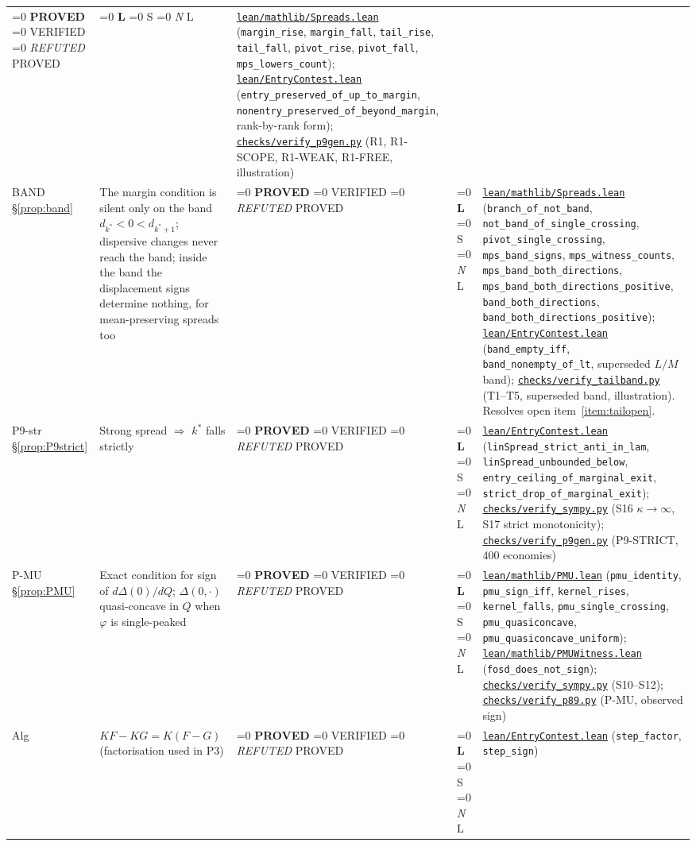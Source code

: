 \documentclass[11pt]{article}
\newcommand{\file}[1]{\href{run:#1}{\texttt{#1}}}
\newcommand{\status}[1]{%
  \ifnum\pdfstrcmp{#1}{PROVED}=0 \textbf{PROVED}%
  \else\ifnum\pdfstrcmp{#1}{VERIFIED}=0 VERIFIED%
  \else\ifnum\pdfstrcmp{#1}{REFUTED}=0 \emph{REFUTED}%
  \else #1\fi\fi\fi}
\newcommand{\tier}[1]{%
  \ifnum\pdfstrcmp{#1}{L}=0 \textbf{L}%
  \else\ifnum\pdfstrcmp{#1}{S}=0 S%
  \else\ifnum\pdfstrcmp{#1}{N}=0 \emph{N}%
  \else #1\fi\fi\fi}
\begin{document}
\begin{longtable}{@{}p{1.5cm}p{5.0cm}p{1.5cm}p{0.8cm}p{6.0cm}@{}}
  \status{PROVED} & \tier{L} &
  \file{lean/mathlib/Spreads.lean} (\texttt{margin\_rise}, \texttt{margin\_fall}, \texttt{tail\_rise}, \texttt{tail\_fall}, \texttt{pivot\_rise}, \texttt{pivot\_fall}, \texttt{mps\_lowers\_count}); \file{lean/EntryContest.lean} (\texttt{entry\_preserved\_of\_up\_to\_margin}, \texttt{nonentry\_preserved\_of\_beyond\_margin}, rank-by-rank form); \file{checks/verify\_p9gen.py} (R1, R1-SCOPE, R1-WEAK, R1-FREE, illustration) \\[4pt]
BAND \S\ref{prop:band} & The margin condition is silent only on the band
  $d_{k^*}<0<d_{k^*+1}$; dispersive changes never reach the band; inside the
  band the displacement signs determine nothing, for mean-preserving spreads
  too &
  \status{PROVED} & \tier{L} &
  \file{lean/mathlib/Spreads.lean} (\texttt{branch\_of\_not\_band},
  \texttt{not\_band\_of\_single\_crossing}, \texttt{pivot\_single\_crossing},
  \texttt{mps\_band\_signs}, \texttt{mps\_witness\_counts},
  \texttt{mps\_band\_both\_directions},
  \texttt{mps\_band\_both\_directions\_positive}, \texttt{band\_both\_directions},
  \texttt{band\_both\_directions\_positive}); \file{lean/EntryContest.lean}
  (\texttt{band\_empty\_iff}, \texttt{band\_nonempty\_of\_lt}, superseded
  $L/M$ band); \file{checks/verify\_tailband.py} (T1--T5, superseded band,
  illustration). Resolves open item~\ref{item:tailopen}. \\[4pt]
P9-str \S\ref{prop:P9strict} & Strong spread $\Rightarrow$ $k^*$ falls strictly &
  \status{PROVED} & \tier{L} &
  \file{lean/EntryContest.lean} (\texttt{linSpread\_strict\_anti\_in\_lam}, \texttt{linSpread\_unbounded\_below}, \texttt{entry\_ceiling\_of\_marginal\_exit}, \texttt{strict\_drop\_of\_marginal\_exit}); \file{checks/verify\_sympy.py} (S16 $\kappa\to\infty$, S17 strict monotonicity); \file{checks/verify\_p9gen.py} (P9-STRICT, 400 economies) \\[4pt]
P-MU \S\ref{prop:PMU} & Exact condition for sign of $d\Delta(0)/dQ$; $\Delta(0,\cdot)$ quasi-concave in $Q$ when $\varphi$ is single-peaked &
  \status{PROVED} & \tier{L} &
  \file{lean/mathlib/PMU.lean} (\texttt{pmu\_identity}, \texttt{pmu\_sign\_iff}, \texttt{kernel\_rises}, \texttt{kernel\_falls}, \texttt{pmu\_single\_crossing}, \texttt{pmu\_quasiconcave}, \texttt{pmu\_quasiconcave\_uniform}); \file{lean/mathlib/PMUWitness.lean} (\texttt{fosd\_does\_not\_sign}); \file{checks/verify\_sympy.py} (S10--S12); \file{checks/verify\_p89.py} (P-MU, observed sign) \\[4pt]
Alg & $KF-KG=K(F-G)$ (factorisation used in P3) &
  \status{PROVED} & \tier{L} &
  \file{lean/EntryContest.lean} (\texttt{step\_factor}, \texttt{step\_sign}) \\
\end{longtable}
\label{tab:index}
\end{document}
